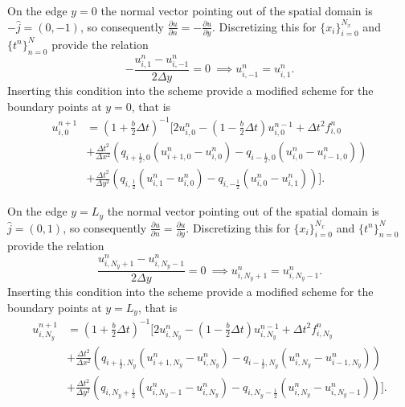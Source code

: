 \documentclass[11pt]{article}
\begin{document}
On the edge $y=0$ the normal vector pointing out of the spatial domain is $-\hat{j} = (0,-1)$, so consequently $\frac{\partial u}{\partial n} = -\frac{\partial u}{\partial y}$.
Discretizing this for $\{x_i\}_{i=0}^{N_x}$ and $\{t^n\}_{n=0}^N$ provide the relation
\begin{equation*}
-\frac{u_{i,1}^n - u_{i,-1}^n}{2\Delta y} = 0 \ \implies u_{i,-1}^n = u_{i,1}^n.
\end{equation*}
Inserting this condition into the scheme provide a modified scheme for the boundary points at $y=0$, that is
\begin{align}
u_{i,0}^{n+1} &= (1+\frac{b}{2}\Delta t)^{-1} \bigg[2u_{i,0}^n - (1-\frac{b}{2}\Delta t) u_{i,0}^{n-1} + \Delta t^2 f_{i,0}^n \nonumber \\
&+ \frac{\Delta t^2}{\Delta x^2} \left(q_{i+\frac{1}{2},0} (u_{i+1,0}^n - u_{i,0}^n) -  q_{i-\frac{1}{2},0} (u_{i,0}^n - u_{i-1,0}^n) \right) \\
&+ \frac{\Delta t^2}{\Delta y^2} \left(q_{i,\frac{1}{2}} (u_{i,1}^n - u_{i,0}^n) -  q_{i,-\frac{1}{2}} (u_{i,0}^n - u_{i,1}^n) \right) \bigg]. \nonumber
\end{align}

On the edge $y=L_y$ the normal vector pointing out of the spatial domain is $\hat{j} = (0,1)$, so consequently $\frac{\partial u}{\partial n} = \frac{\partial u}{\partial y}$.
Discretizing this for $\{x_i\}_{i=0}^{N_x}$ and $\{t^n\}_{n=0}^N$ provide the relation
\begin{equation*}
\frac{u_{i,N_y + 1}^n - u_{i,N_y - 1}^n}{2\Delta y} = 0 \ \implies u_{i,N_y + 1}^n = u_{i,N_y -1}^n.
\end{equation*}
Inserting this condition into the scheme provide a modified scheme for the boundary points at $y=L_y$, that is
\begin{align}
u_{i,N_y}^{n+1} &= (1+\frac{b}{2}\Delta t)^{-1} \bigg[2u_{i,N_y}^n - (1-\frac{b}{2}\Delta t) u_{i,N_y}^{n-1} + \Delta t^2 f_{i,N_y}^n \nonumber \\
&+ \frac{\Delta t^2}{\Delta x^2} \left(q_{i+\frac{1}{2},N_y} (u_{i+1,N_y}^n - u_{i,N_y}^n) -  q_{i-\frac{1}{2},N_y} (u_{i,N_y}^n - u_{i-1,N_y}^n) \right) \\
&+ \frac{\Delta t^2}{\Delta y^2} \left(q_{i,N_y+\frac{1}{2}} (u_{i,N_y-1}^n - u_{i,N_y}^n) -  q_{i,N_y-\frac{1}{2}} (u_{i,N_y}^n - u_{i,N_y-1}^n) \right) \bigg]. \nonumber
\end{align}
\end{document}
